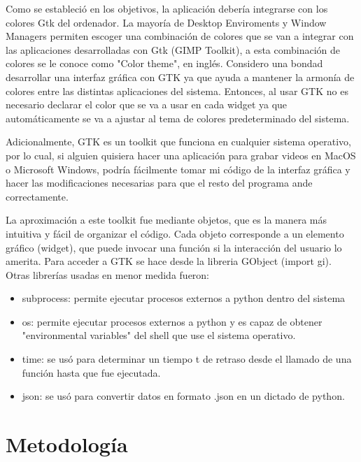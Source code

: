 \documentclass[conference]{IEEEtran}
\begin{document}
Como se estableció en los objetivos, la aplicación debería integrarse con los colores Gtk del ordenador. La mayoría de Desktop Enviroments y Window Managers permiten escoger una combinación de colores que se van a integrar con las aplicaciones desarrolladas con Gtk (GIMP Toolkit), a esta combinación de colores se le conoce como "Color theme", en inglés. Considero una bondad desarrollar una interfaz gráfica con GTK ya que ayuda a mantener la armonía de colores entre las distintas aplicaciones del
sistema. Entonces, al usar GTK no es necesario declarar el color que se va a usar en cada widget ya que automáticamente se va a ajustar al tema de colores predeterminado del sistema\cite{b9}.

Adicionalmente, GTK es un toolkit que funciona en cualquier sistema operativo, por lo cual, si alguien quisiera hacer una aplicación para grabar videos en MacOS o Microsoft Windows, podría fácilmente tomar mi código de la interfaz gráfica y hacer las modificaciones necesarias para que el resto del programa ande correctamente.  

La aproximación a este toolkit fue mediante objetos, que es la manera más intuitiva y fácil de organizar el código. Cada objeto corresponde a un elemento gráfico (widget), que puede invocar una función si la interacción del usuario lo amerita. Para acceder a GTK se hace desde la libreria GObject (import gi). Otras librerías usadas en menor medida fueron:
\begin{itemize}
    \item subprocess: permite ejecutar procesos externos a python dentro del sistema
    \item os: permite ejecutar procesos externos a python y es capaz de obtener "environmental variables" del shell que use el sistema operativo.
    \item time: se usó para determinar un tiempo t de retraso desde el llamado de una función hasta que fue ejecutada.
    \item json: se usó para convertir datos en formato .json en un dictado de python.
\end{itemize}

\section{Metodología}
\end{document}
